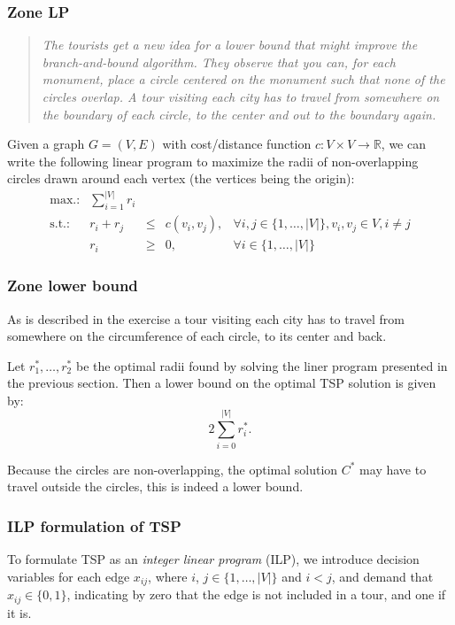 \documentclass{article}
\begin{document}
\subsubsection*{Zone LP}
\begin{quotation}\itshape
The tourists get a new idea for a lower bound that might improve the branch-and-bound algorithm. They observe that you can, for each monument, place a circle centered on the monument such that none of the circles overlap. A tour visiting each city has to travel from somewhere on the boundary of each circle, to the center and out to the boundary again.
\end{quotation}
Given a graph $G = (V,E)$ with cost/distance function $c : V \times V
\rightarrow \mathbb{R}$, we can write the following linear program to
maximize the radii of non-overlapping circles drawn around each vertex
(the vertices being the origin):
\[
\begin{array}{lrcll}
\textrm{max.:} & \displaystyle\sum_{i=1}^{|V|} r_i  & & & \\
\textrm{s.t.:} &  r_i+r_j                &\leq & c(v_i,v_j), & \forall i,j\in \{1,\dots,|V|\}, v_i, v_j\in V, i \not = j \\
& r_i &\geq & 0, & \forall i \in \{1,\dots,|V|\}
\end{array}
\]

\subsubsection*{Zone lower bound}

As is described in the exercise a tour visiting each city has to
travel from somewhere on the circumference of each circle, to its
center and back.

Let $r_1^*,\dots,r_2^*$ be the optimal radii found by solving the
liner program presented in the previous section. Then a lower bound on
the optimal TSP solution is given by:
\[
2\sum_{i=0}^{|V|}r_i^*.
\]

Because the circles are non-overlapping, the optimal solution $C^*$ may
have to travel outside the circles, this is indeed a lower bound.

\subsubsection*{ILP formulation of TSP}

To formulate TSP as an \emph{integer linear program} (ILP), we
introduce decision variables for each edge $x_{ij}$, where $i$, $j \in
\{1,\dots,|V|\}$ and $i<j$, and demand that $x_{ij}\in\{0,1\}$, indicating by
zero that the edge is not included in a tour, and one if it is.
\end{document}
